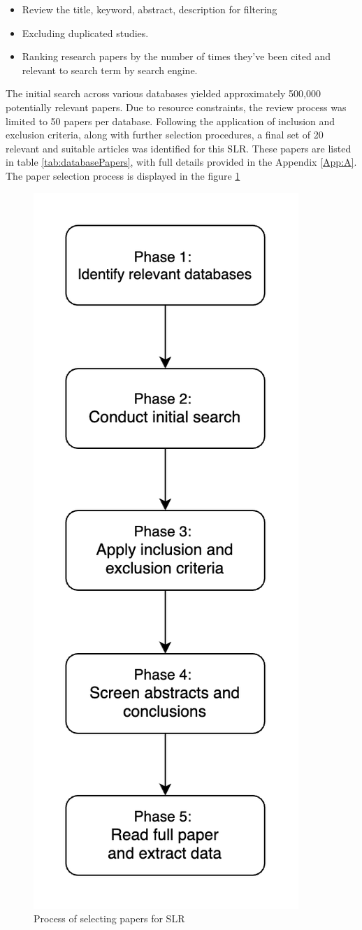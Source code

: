 \begin{itemize}
    \item Review the title, keyword, abstract, description for filtering
    \item Excluding duplicated studies.
    \item Ranking research papers by the number of times they've been cited and relevant to search term by search engine.
\end{itemize}


The initial search across various databases yielded approximately 500,000 potentially relevant papers. Due to resource constraints, the review process was limited to 50 papers per database. Following the application of inclusion and exclusion criteria, along with further selection procedures, a final set of 20 relevant and suitable articles was identified for this SLR. These papers are listed in table \ref{tab:databasePapers}, with full details provided in the Appendix \ref{App:A}. The paper selection process is displayed in the figure \ref{fig:paperselectionprocess}



\begin{figure}[ht]
    \centering
    \includegraphics[width=0.3\linewidth]{figs/paperselectionprocess.png}
    \caption{Process of selecting papers for SLR}
    \label{fig:paperselectionprocess}
\end{figure}



